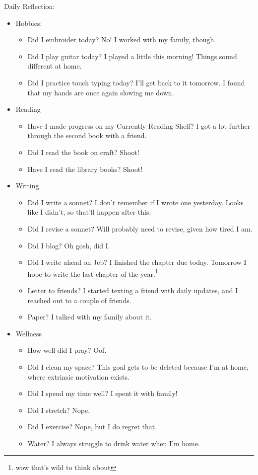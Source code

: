 \documentclass[12pt]{article}[titlepage]
\renewcommand{\,}{\textsuperscript{,}}
\begin{document}
Daily Reflection:
\begin{itemize}
\item Hobbies:
\begin{itemize}
\item Did I embroider today? No! I worked with my family, though.
\item Did I play guitar today? I played a little this morning! Things sound different at home.
\item Did I practice touch typing today? I'll get back to it tomorrow. I found that my hands are once again slowing me down.
\end{itemize}
\item Reading
\begin{itemize}
\item Have I made progress on my Currently Reading Shelf? I got a lot further through the second book with a friend.
\item Did I read the book on craft? Shoot!
\item Have I read the library books? Shoot!
\end{itemize}
\item Writing
\begin{itemize}
\item Did I write a sonnet? I don't remember if I wrote one yesterday. Looks like I didn't, so that'll happen after this.
\item Did I revise a sonnet? Will probably need to revise, given how tired I am.
\item Did I blog? Oh gosh, did I.
\item Did I write ahead on Jeb? I finished the chapter due today. Tomorrow I hope to write the last chapter of the year.\footnote{wow that's wild to think about}
\item Letter to friends? I started texting a friend with daily updates, and I reached out to a couple of friends.
\item Paper? I talked with my family about it.
\end{itemize}
\item Wellness
\begin{itemize}
\item How well did I pray? Oof.
\item Did I clean my space? This goal gets to be deleted because I'm at home, where extrinsic motivation exists.
\item Did I spend my time well? I spent it with family!
\item Did I stretch? Nope.
\item Did I exercise? Nope, but I do regret that.
\item Water? I always struggle to drink water when I'm home.
\end{itemize}
\end{itemize}
\end{document}
